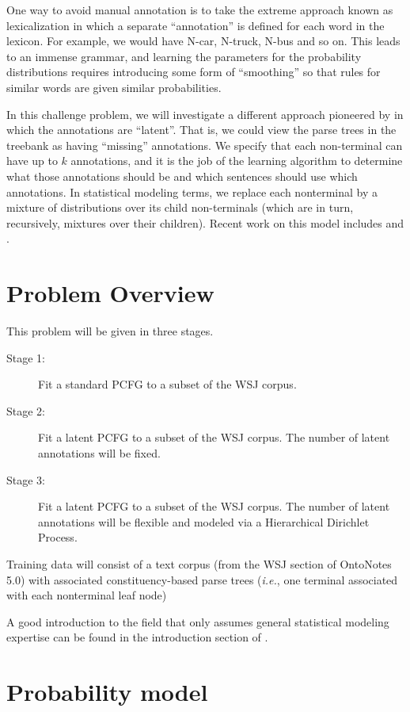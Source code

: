 \documentclass[english]{article}
\begin{document}
One way to avoid manual annotation is to take the extreme approach known as lexicalization in which a separate ``annotation'' is defined for each word in the lexicon. For example, we would have N-car, N-truck, N-bus and so on.  This leads to an immense grammar, and learning the parameters for the probability distributions requires introducing some form of ``smoothing'' so that rules for similar words are given similar probabilities.

In this challenge problem, we will investigate a different approach pioneered by \citet{Matsuzaki2005} in which the annotations are ``latent''.  That is, we could view the parse trees in the treebank as having ``missing'' annotations.  We specify that each non-terminal can have up to $k$ annotations, and it is the job of the learning algorithm to determine what those annotations should be and which sentences should use which annotations.  In statistical modeling terms, we replace each nonterminal by a mixture of distributions over its child non-terminals (which are in turn, recursively, mixtures over their children).  Recent work on this model includes \citet{Petrov2006} and \citet{Cohen2012}.  

\section{Problem Overview}

This problem will be given in three stages.  
\begin{description}
\item[Stage 1:] Fit a standard PCFG to a subset of the WSJ corpus.
\item[Stage 2:] Fit a latent PCFG to a subset of the WSJ corpus. The number of latent annotations will be fixed.
\item[Stage 3:] Fit a latent PCFG to a subset of the WSJ corpus. The number of latent annotations will be flexible and modeled via a Hierarchical Dirichlet Process.
\end{description}

Training data will consist of a text corpus (from the WSJ section of OntoNotes 5.0) with associated constituency-based parse trees (\emph{i.e.}, one terminal associated with each nonterminal leaf node)

A good introduction to the field that only assumes general statistical modeling expertise can be found in the introduction section of \citet{Liang2009}.

\section{Probability model}
\end{document}
